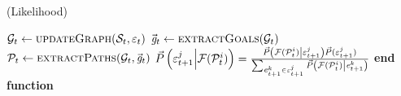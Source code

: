 \documentclass{article}
\begin{document}
\begin{algorithm}
	\caption{(Likelihood)}
	\label{array-sum}
	\begin{algorithmic}[1]
			\Statex
			\State $\mathcal{G}_{t} \gets \Call{updateGraph}{\mathcal{S}_{t},
			\varepsilon_t}$
			\State $\vec{\mathit{g}}_{t} \gets \Call{extractGoals}{\mathcal{G}_{t}}$
			\State $\mathcal{P}_{t} \gets \Call{extractPaths}{\mathcal{G}_{t},
			\vec{\mathit{g}}_{t}}$
			\Statex
				\State {}
			\Else
						\State
						$\vec{P}\left(\varepsilon_{t+1}^{j}\middle|\mathcal{F}(\mathcal{P}_{t}^{i})\right)
						=\frac{\vec{P}\left(\mathcal{F}(\mathcal{P}_{t}^{i})\middle|\varepsilon_{t+1}^{j}\right) 
						\vec{P}(\varepsilon_{t+1}^{j})}
						{\sum\nolimits_{\textit{\scriptsize{e}}_{t+1}^{k} \in \mathcal{\varepsilon}_{t+1}^{j}}
						\vec{P}\left(\mathcal{F}(\mathcal{P}_{t}^{i})\middle|\textit{\scriptsize{e}}_{t+1}^{k}\right)}$
						\State
					\EndFor
				\EndFor
			\EndIf
		\EndFunction
		\State \textbf{end function}
	\end{algorithmic}
\end{algorithm}
\end{document}
